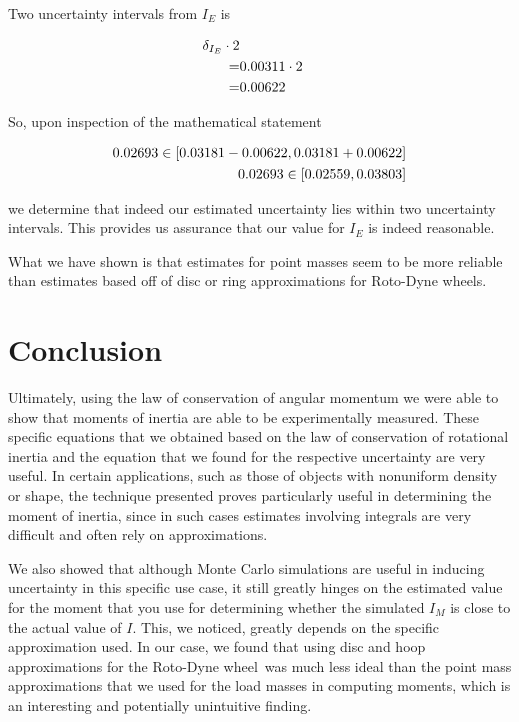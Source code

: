 \documentclass[coverpage]{article}
\newcommand{\rwheel}{Roto-Dyne wheel}
\begin{document}
	Two uncertainty intervals from $I_E$ is
	
	\begin{align}
		\delta_{I_E} \cdot 2 \notag \\
		=& 0.00311 \cdot 2 \notag \\
		=& 0.00622
	\end{align}

	So, upon inspection of the mathematical statement
	
	\begin{align}
		0.02693 \in [0.03181 - 0.00622, 0.03181 + 0.00622] \notag \\
		0.02693 \in [0.02559, 0.03803] \notag \\
	\end{align}

	we determine that indeed our estimated uncertainty lies within two uncertainty intervals. This provides us assurance that our value for $I_E$ is indeed reasonable. 
	
	What we have shown is that estimates for point masses seem to be more reliable than estimates based off of disc or ring approximations for \rwheel s.
	
	\section{Conclusion}
	
	Ultimately, using the law of conservation of angular momentum we were able to show that moments of inertia are able to be experimentally measured. These specific equations that we obtained based on the law of conservation of rotational inertia and the equation that we found for the respective uncertainty are very useful. In certain applications, such as those of objects with nonuniform density or shape, the technique presented proves particularly useful in determining the moment of inertia, since in such cases estimates involving integrals are very difficult and often rely on approximations. 
	
	We also showed that although Monte Carlo simulations are useful in inducing uncertainty in this specific use case, it still greatly hinges on the estimated value for the moment that you use for determining whether the simulated $I_M$ is close to the actual value of $I$. This, we noticed, greatly depends on the specific approximation used. In our case, we found that using disc and hoop approximations for the \rwheel~was much less ideal than the point mass approximations that we used for the load masses in computing moments, which is an interesting and potentially unintuitive finding.
	
\end{document}
